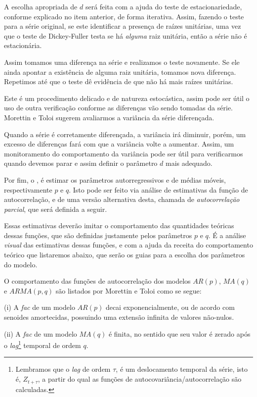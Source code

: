 A escolha apropriada de $d$ será feita com a ajuda do teste de estacionariedade, conforme explicado no item anterior, de forma iterativa. Assim, fazendo o teste para a série original, se este identificar a presença de raízes unitárias, uma vez que o teste de Dickey-Fuller testa se há \emph{alguma} raiz unitária, então a série não é estacionária. 

Assim tomamos uma diferença na série e realizamos o teste novamente. Se ele ainda apontar a existência de alguma raiz unitária, tomamos nova diferença. Repetimos até que o teste dê evidência de que não há mais raízes unitárias.

Este é um procedimento delicado e de natureza estocástica, assim pode ser útil o uso de outra verificação conforme as diferenças vão sendo tomadas da série. Morettin e Toloi \citep{morettin} sugerem avaliarmos a variância da série diferençada. 

Quando a série é corretamente diferençada, a variância irá diminuir, porém, um excesso de diferenças fará com que a variância volte a aumentar. Assim, um monitoramento do comportamento da variância pode ser útil para verificarmos quando devemos parar e assim definir o parâmetro $d$ mais adequado.

Por fim, o , é estimar os parâmetros autorregressivos e de médias móveis, respectivamente $p$ e $q$. Isto pode ser feito via análise de estimativas da função de autocorrelação, e de uma versão alternativa desta, chamada de \emph{autocorrelação parcial}, que será definida a seguir.

Essas estimativas deverão imitar o comportamento das quantidades teóricas dessas funções, que são definidas justamente pelos parâmetros $p$ e $q$. É a análise \emph{visual} das estimativas dessas funções, e com a ajuda da receita do comportamento teórico que listaremos abaixo, que serão os guias para a escolha dos parâmetros do modelo.

O comportamento das funções de autocorrelação dos modelos $AR(p)$, $MA(q)$ e $ARMA(p, q)$ são listados por Morettin e Toloi \citep{morettin} como se segue:
 
(i) A \emph{fac} de um modelo $AR(p)$ decai exponencialmente, ou de acordo com senoides amortecidas, possuindo uma extensão infinita de valores não-nulos.

(ii) A \emph{fac} de um modelo $MA(q)$ é finita, no sentido que seu valor é zerado após o \emph{lag}\footnote{Lembramos que o \emph{lag} de ordem $\tau$, é um deslocamento temporal da série, isto é, $Z_{t{+}\tau}$, a partir do qual as funções de autocovariância/autocorrelação são calculadas.} temporal de ordem $q$.

